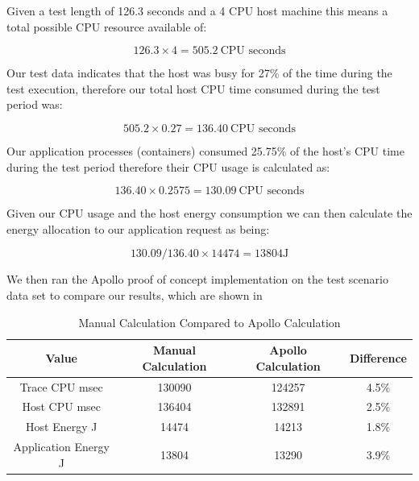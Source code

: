 Given a test length of 126.3 seconds and a 4 CPU host machine this means a total possible CPU resource available of:

\begin{equation}
126.3 \times 4 = 505.2 ~\text{CPU seconds}
\end{equation}

Our test data indicates that the host was busy for 27\% of the time during the test execution, therefore our total host CPU time consumed during the test period was:

\begin{equation}
505.2 \times 0.27 = 136.40 ~\text{CPU seconds}
\end{equation}

Our application processes (containers) consumed 25.75\% of the host's CPU time during the test period therefore their CPU usage is calculated as:

\begin{equation}
136.40 \times 0.2575 = 130.09 ~\text{CPU seconds}
\end{equation}

Given our CPU usage and the host energy consumption we can then calculate the energy allocation to our application request as being:

\begin{equation}
130.09 / 136.40 \times 14474 = 13804\text{J}
\end{equation}

We then ran the Apollo proof of concept implementation on the test scenario data set to compare our results, which are shown in 

\begin{table}
\centering
\caption{Manual Calculation Compared to Apollo Calculation}
\label{table:calculationresults}
\footnotesize
\begin{tabular}{|c|c|c|c|}
\hline
Value & Manual Calculation & Apollo Calculation & Difference \\
\hline
\hline
Trace CPU msec       & 130090 & 124257 & 4.5\% \\
Host CPU msec        & 136404 & 132891 & 2.5\% \\
Host Energy J        & 14474  & 14213  & 1.8\% \\
Application Energy J & 13804  & 13290  & 3.9\% \\
\hline
\end{tabular}
\end{table}

